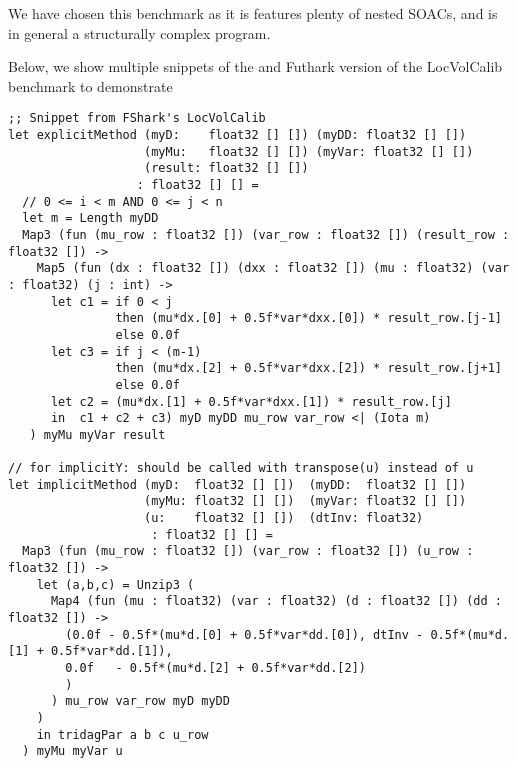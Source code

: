 We have chosen this benchmark as it is features plenty of nested SOACs, and is
in general a structurally complex program.

Below, we show multiple snippets of the \fshark{} and Futhark version of the
LocVolCalib benchmark to demonstrate
\begin{verbatim}
;; Snippet from FShark's LocVolCalib
let explicitMethod (myD:    float32 [] []) (myDD: float32 [] [])
                   (myMu:   float32 [] []) (myVar: float32 [] [])
                   (result: float32 [] [])
                  : float32 [] [] =
  // 0 <= i < m AND 0 <= j < n
  let m = Length myDD
  Map3 (fun (mu_row : float32 []) (var_row : float32 []) (result_row : float32 []) ->
    Map5 (fun (dx : float32 []) (dxx : float32 []) (mu : float32) (var : float32) (j : int) ->
      let c1 = if 0 < j
               then (mu*dx.[0] + 0.5f*var*dxx.[0]) * result_row.[j-1]
               else 0.0f
      let c3 = if j < (m-1)
               then (mu*dx.[2] + 0.5f*var*dxx.[2]) * result_row.[j+1]
               else 0.0f
      let c2 = (mu*dx.[1] + 0.5f*var*dxx.[1]) * result_row.[j]
      in  c1 + c2 + c3) myD myDD mu_row var_row <| (Iota m)
   ) myMu myVar result

// for implicitY: should be called with transpose(u) instead of u
let implicitMethod (myD:  float32 [] [])  (myDD:  float32 [] [])
                   (myMu: float32 [] [])  (myVar: float32 [] [])
                   (u:    float32 [] [])  (dtInv: float32)
                    : float32 [] [] =
  Map3 (fun (mu_row : float32 []) (var_row : float32 []) (u_row : float32 []) ->
    let (a,b,c) = Unzip3 (
      Map4 (fun (mu : float32) (var : float32) (d : float32 []) (dd : float32 []) ->
        (0.0f - 0.5f*(mu*d.[0] + 0.5f*var*dd.[0]), dtInv - 0.5f*(mu*d.[1] + 0.5f*var*dd.[1]), 
        0.0f   - 0.5f*(mu*d.[2] + 0.5f*var*dd.[2])
        )
      ) mu_row var_row myD myDD
    )
    in tridagPar a b c u_row
  ) myMu myVar u
\end{verbatim}

